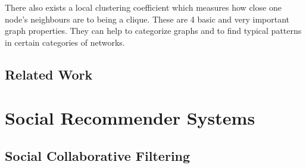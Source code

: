 There also exists a local clustering coefficient which measures how close one node's neighbours are to being a clique.
\newline\newline
These are 4 basic and very important graph properties. They can help to categorize graphs and to find typical patterns in certain categories of networks. 

\subsection{Related Work}
\label{sst:snrelatedwork}

\section{Social Recommender Systems}
\label{st:socialrecommendersystems}

\subsection{Social Collaborative Filtering}
\label{sst:socialcf}